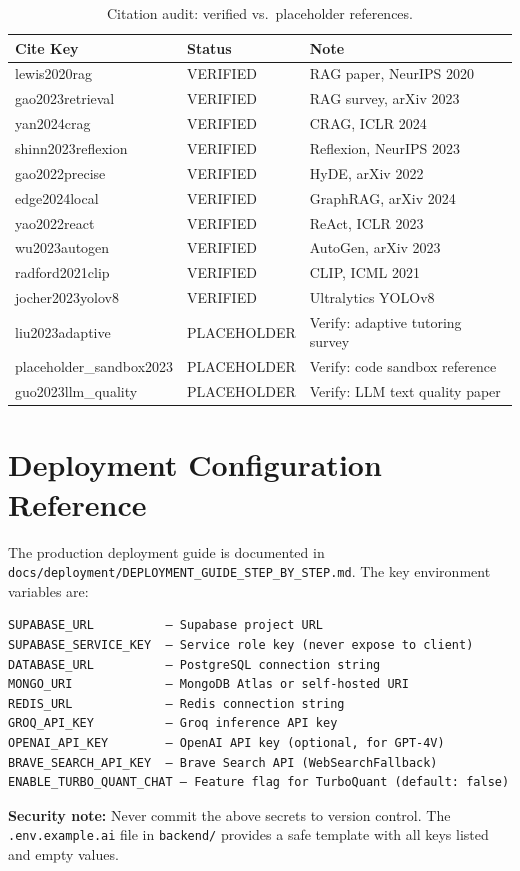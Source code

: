 \begin{table}[ht]
    \centering
    \caption{Citation audit: verified vs.\ placeholder references.}
    \label{tab:citation-audit}
    \begin{tabular}{lll}
        \toprule
        \textbf{Cite Key} & \textbf{Status} & \textbf{Note} \\
        \midrule
        lewis2020rag       & VERIFIED & RAG paper, NeurIPS 2020 \\
        gao2023retrieval   & VERIFIED & RAG survey, arXiv 2023 \\
        yan2024crag        & VERIFIED & CRAG, ICLR 2024 \\
        shinn2023reflexion & VERIFIED & Reflexion, NeurIPS 2023 \\
        gao2022precise     & VERIFIED & HyDE, arXiv 2022 \\
        edge2024local      & VERIFIED & GraphRAG, arXiv 2024 \\
        yao2022react       & VERIFIED & ReAct, ICLR 2023 \\
        wu2023autogen      & VERIFIED & AutoGen, arXiv 2023 \\
        radford2021clip    & VERIFIED & CLIP, ICML 2021 \\
        jocher2023yolov8   & VERIFIED & Ultralytics YOLOv8 \\
        liu2023adaptive    & PLACEHOLDER & Verify: adaptive tutoring survey \\
        placeholder\_sandbox2023 & PLACEHOLDER & Verify: code sandbox reference \\
        guo2023llm\_quality & PLACEHOLDER & Verify: LLM text quality paper \\
        \bottomrule
    \end{tabular}
\end{table}

\section{Deployment Configuration Reference}
\label{sec:deployment}

The production deployment guide is documented in
\texttt{docs/deployment/DEPLOYMENT\_GUIDE\_STEP\_BY\_STEP.md}. The key
environment variables are:

\begin{verbatim}
SUPABASE_URL          — Supabase project URL
SUPABASE_SERVICE_KEY  — Service role key (never expose to client)
DATABASE_URL          — PostgreSQL connection string
MONGO_URI             — MongoDB Atlas or self-hosted URI
REDIS_URL             — Redis connection string
GROQ_API_KEY          — Groq inference API key
OPENAI_API_KEY        — OpenAI API key (optional, for GPT-4V)
BRAVE_SEARCH_API_KEY  — Brave Search API (WebSearchFallback)
ENABLE_TURBO_QUANT_CHAT — Feature flag for TurboQuant (default: false)
\end{verbatim}

\textbf{Security note:} Never commit the above secrets to version control.
The \texttt{.env.example.ai} file in \texttt{backend/} provides a safe
template with all keys listed and empty values.